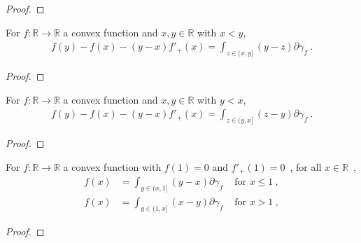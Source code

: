 \begin{proof}%
\uses{}

\end{proof}

\begin{lemma}
  \label{lem:convex_taylor_gt}
  \leanok
  For $f: \mathbb{R} \to \mathbb{R}$ a convex function and $x,y \in \mathbb{R}$ with $x < y$,
  \begin{align*}
  f(y) - f(x) - (y - x)f'_+(x) = \int_{z \in (x,y]} (y - z) \partial \gamma_f \: .
  \end{align*}
\end{lemma}

\begin{proof}\leanok
\uses{}

\end{proof}

\begin{lemma}
  \label{lem:convex_taylor_lt}
  \leanok
  For $f: \mathbb{R} \to \mathbb{R}$ a convex function and $x,y \in \mathbb{R}$ with $y < x$,
  \begin{align*}
  f(y) - f(x) - (y - x)f'_+(x) = \int_{z \in (y,x]} (z - y) \partial \gamma_f \: .
  \end{align*}
\end{lemma}

\begin{proof}\leanok
\uses{}

\end{proof}

\begin{corollary}
  \label{cor:convex_taylor_one}
  For $f: \mathbb{R} \to \mathbb{R}$ a convex function with $f(1) = 0$ and $f'_+(1) = 0$~, for all $x \in \mathbb{R}$~,
  \begin{align*}
  f(x) &= \int_{y \in (x, 1]} (y - x) \partial\gamma_f & \text{ for } x \le 1 \: ,
  \\
  f(x) &= \int_{y \in (1, x]} (x - y) \partial\gamma_f & \text{ for } x > 1 \: ,
  \end{align*}
\end{corollary}

\begin{proof}%
{}

\end{proof}

